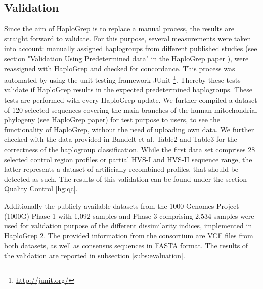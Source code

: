 \begin{enumerate}
\begin{figure}[!ht]
    \label{hg:phylogeneticTree}
\end{figure}
\end{enumerate}

\subsection{Validation}
Since the aim of HaploGrep is to replace a manual process, the results are straight forward to validate. For this purpose, several measurements were taken into account: manually assigned haplogroups from different published studies (see section "Validation Using Predetermined data" in the HaploGrep paper \cite{Kloss-Brandstatter2011}), were reassigned with HaploGrep and checked for concordance. This process was automated by using the unit testing framework JUnit \footnote{\url{http://junit.org/}}. Thereby these tests validate if HaploGrep results in the expected predetermined haplogroups. These tests are performed with every HaploGrep update. We further compiled a dataset of 120 selected sequences covering the main branches of the human mitochondrial phylogeny (see HaploGrep paper) for test purpose to users, to see the functionality of HaploGrep, without the need of uploading own data. We further checked with the data provided in Bandelt et al. \cite{Bandelt2012} Table2 and Table3 for the correctness of the haplogroup classification. While the first data set comprises 28 selected control region profiles or partial HVS-I and HVS-II sequence range, the latter represents a dataset of artificially recombined profiles, that should be detected as such. The results of this validation can be found under the section Quality Control \ref{hg:qc}.

Additionally the publicly available datasets from the 1000 Genomes Project (1000G) Phase 1 with 1,092 samples and Phase 3 comprising 2,534 samples were used for validation purpose of the different dissimilarity indices, implemented in HaploGrep 2. The provided information from the consortium are VCF files from both datasets, as well as consensus sequences in FASTA format. The results of the validation are reported in subsection \ref{subs:evaluation}. 

